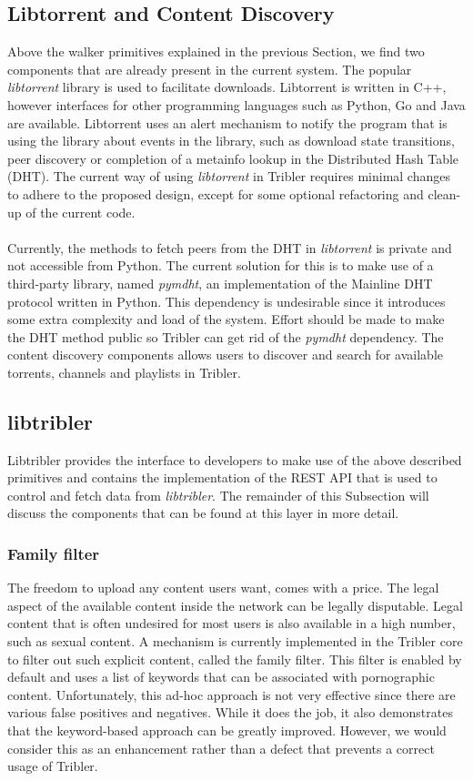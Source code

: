 \subsection{Libtorrent and Content Discovery}
Above the walker primitives explained in the previous Section, we find two components that are already present in the current system. The popular \emph{libtorrent} library is used to facilitate downloads. Libtorrent is written in C++, however interfaces for other programming languages such as Python, Go and Java are available. Libtorrent uses an alert mechanism to notify the program that is using the library about events in the library, such as download state transitions, peer discovery or completion of a metainfo lookup in the Distributed Hash Table (DHT). The current way of using \emph{libtorrent} in Tribler requires minimal changes to adhere to the proposed design, except for some optional refactoring and clean-up of the current code.\\\\
Currently, the methods to fetch peers from the DHT in \emph{libtorrent} is private and not accessible from Python. The current solution for this is to make use of a third-party library, named \emph{pymdht}, an implementation of the Mainline DHT protocol written in Python. This dependency is undesirable since it introduces some extra complexity and load of the system. Effort should be made to make the DHT method public so Tribler can get rid of the \emph{pymdht} dependency.
The content discovery components allows users to discover and search for available torrents, channels and playlists in Tribler.

\subsection{libtribler}
Libtribler provides the interface to developers to make use of the above described primitives and contains the implementation of the REST API that is used to control and fetch data from \emph{libtribler}. The remainder of this Subsection will discuss the components that can be found at this layer in more detail.

\subsubsection{\textbf{Family filter}}
The freedom to upload any content users want, comes with a price. The legal aspect of the available content inside the network can be legally disputable. Legal content that is often undesired for most users is also available in a high number, such as sexual content. A mechanism is currently implemented in the Tribler core to filter out such explicit content, called the family filter. This filter is enabled by default and uses a list of keywords that can be associated with pornographic content. Unfortunately, this ad-hoc approach is not very effective since there are various false positives and negatives. While it does the job, it also demonstrates that the keyword-based approach can be greatly improved. However, we would consider this as an enhancement rather than a defect that prevents a correct usage of Tribler.

